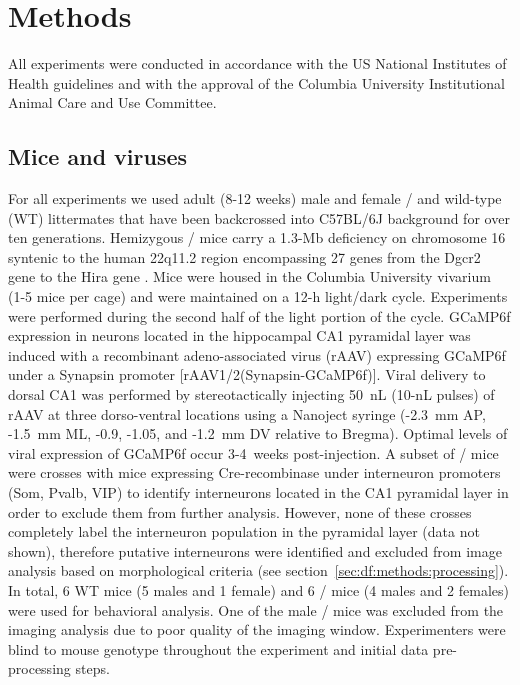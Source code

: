 \section{Methods}

All experiments were conducted in accordance with the US National Institutes of Health guidelines and with the approval of the Columbia University Institutional Animal Care and Use Committee.

\subsection{Mice and viruses}
\label{sec:df:methods:mice}

For all experiments we used adult (8-12 weeks) male and female \df/ and wild-type (WT) littermates that have been backcrossed into C57BL/6J background for over ten generations. Hemizygous \df/ mice carry a 1.3-Mb deficiency on chromosome 16 syntenic to the human 22q11.2 region encompassing 27 genes from the Dgcr2 gene to the Hira gene \citep{Mukai2008, Stark2008}. Mice were housed in the Columbia University vivarium (1-5 mice per cage) and were maintained on a 12-h light/dark cycle. Experiments were performed during the second half of the light portion of the cycle.  GCaMP6f expression in neurons located in the hippocampal CA1 pyramidal layer was induced with a recombinant adeno-associated virus (rAAV) expressing GCaMP6f under a Synapsin promoter [rAAV1/2(Synapsin-GCaMP6f)]. Viral delivery to dorsal CA1 was performed by stereotactically injecting 50~nL (10-nL pulses) of rAAV at three dorso-ventral locations using a Nanoject syringe (-2.3~mm AP, -1.5~mm ML, -0.9, -1.05, and -1.2~mm DV relative to Bregma). Optimal levels of viral expression of GCaMP6f occur 3-4~weeks post-injection. A subset of \df/ mice were crosses with mice expressing Cre-recombinase under interneuron promoters (Som, Pvalb, VIP) \citep{Lovett-Barron2014} to identify interneurons located in the CA1 pyramidal layer in order to exclude them from further analysis. However, none of these crosses completely label the interneuron population in the pyramidal layer (data not shown), therefore putative interneurons were identified and excluded from image analysis based on morphological criteria (see section~\ref{sec:df:methods:processing}). In total, 6 WT mice (5 males and 1 female) and 6 \df/ mice (4 males and 2 females) were used for behavioral analysis. One of the male \df/ mice was excluded from the imaging analysis due to poor quality of the imaging window. Experimenters were blind to mouse genotype throughout the experiment and initial data pre-processing steps.

